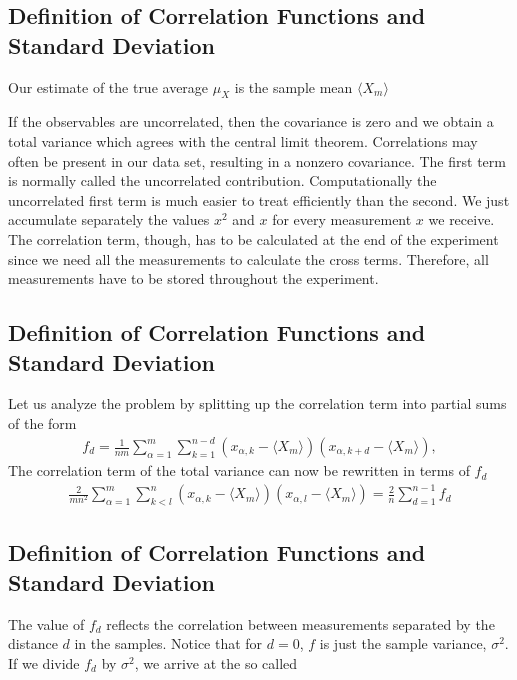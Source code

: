 \documentclass[letterpaper,10pt,english]{sphinxmanual}
\begin{document}
\subsection{Definition of Correlation Functions and Standard Deviation}
\label{\detokenize{chapter3:id5}}
Our estimate of the true average \(\mu_{X}\) is the sample mean \(\langle X_m \rangle\)

If the
observables are uncorrelated, then the covariance is zero and we obtain a total variance
which agrees with the central limit theorem. Correlations may often be present in our data set, resulting in a non\sphinxhyphen{}zero covariance.  The first term is normally called the uncorrelated
contribution.
Computationally the uncorrelated first term is much easier to treat
efficiently than the second.
We just accumulate separately the values \(x^2\) and \(x\) for every
measurement \(x\) we receive. The correlation term, though, has to be
calculated at the end of the experiment since we need all the
measurements to calculate the cross terms. Therefore, all measurements
have to be stored throughout the experiment.


\subsection{Definition of Correlation Functions and Standard Deviation}
\label{\detokenize{chapter3:id6}}
Let us analyze the problem by splitting up the correlation term into
partial sums of the form
\begin{equation*}
\begin{split}
f_d = \frac{1}{nm}\sum_{\alpha=1}^m\sum_{k=1}^{n-d}(x_{\alpha,k}-\langle X_m \rangle)(x_{\alpha,k+d}-\langle X_m \rangle),
\end{split}
\end{equation*}
The correlation term of the total variance can now be rewritten in terms of
\(f_d\)
\begin{equation*}
\begin{split}
\frac{2}{mn^2}\sum_{\alpha=1}^m\sum_{k<l}^n (x_{\alpha,k}-\langle X_m \rangle)(x_{\alpha,l}-\langle X_m \rangle)=
\frac{2}{n}\sum_{d=1}^{n-1} f_d
\end{split}
\end{equation*}

\subsection{Definition of Correlation Functions and Standard Deviation}
\label{\detokenize{chapter3:id7}}
The value of \(f_d\) reflects the correlation between measurements
separated by the distance \(d\) in the samples.  Notice that for
\(d=0\), \(f\) is just the sample variance, \(\sigma^2\). If we divide \(f_d\)
by \(\sigma^2\), we arrive at the so called 
\end{document}
